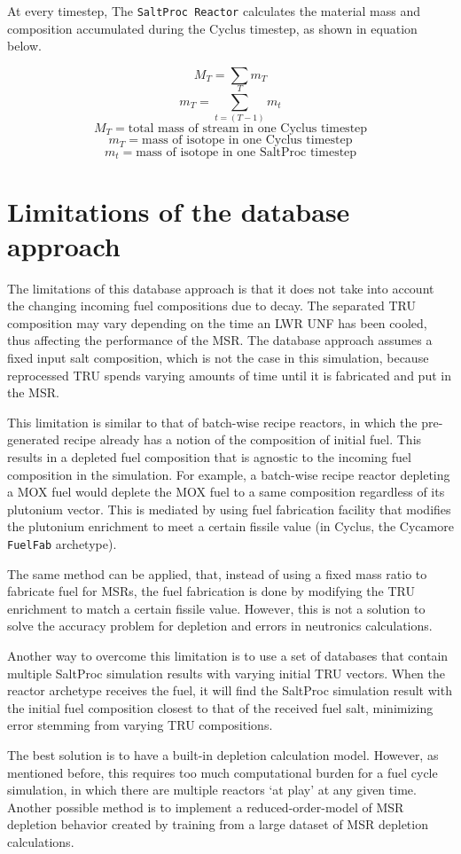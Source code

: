 At every timestep, 
The \texttt{SaltProc Reactor} calculates the material mass
and composition accumulated during the Cyclus timestep,
as shown in equation below.

\[
M_{T} = \sum m_T
\]
\[
m_{T} = \sum_{t=(T-1)}^{T} m_{t}
\]
\[
M_T = \text{total mass of stream in one Cyclus timestep}
\]
\[
m_T = \text{mass of isotope in one Cyclus timestep}
\]
\[
m_t = \text{mass of isotope in one SaltProc timestep}
\]


\section{Limitations of the database approach}
\label{sec:limit}
The limitations of this database approach is that it does not
take into account the changing incoming fuel compositions due to decay.
The separated \gls{TRU} composition may vary depending on the time
an \gls{LWR} \gls{UNF} has been cooled, thus affecting the performance
of the \gls{MSR}. The database approach assumes a fixed input salt
composition, which is not the case in this simulation, because reprocessed
\gls{TRU} spends varying amounts of time until it is fabricated and
put in the \gls{MSR}.

This limitation is similar to that of batch-wise recipe reactors, in which the 
pre-generated recipe already has a notion of the composition of initial fuel.
This results in a depleted fuel composition that is agnostic to the incoming
fuel composition in the simulation. For example, a batch-wise recipe reactor
depleting a \gls{MOX} fuel would deplete the \gls{MOX} fuel to a same
composition regardless of its plutonium vector. This is mediated by using
fuel fabrication facility that modifies the plutonium enrichment to
meet a certain fissile value (in Cyclus, the Cycamore \texttt{FuelFab} archetype).

The same method can be applied, that, instead of using a fixed mass ratio
to fabricate fuel for \glspl{MSR}, the fuel fabrication is done by modifying
the \gls{TRU} enrichment to match a certain fissile value. However, this is
not a solution to solve the accuracy problem for depletion and errors
in neutronics calculations.

Another way to overcome this limitation is to use a set of databases 
that contain multiple SaltProc simulation results with varying initial \gls{TRU}
vectors. When the reactor archetype receives the fuel, it will find the
SaltProc simulation result with the initial fuel composition closest to that
of the received fuel salt, minimizing error stemming from varying
\gls{TRU} compositions.

The best solution is to have a built-in depletion calculation model. However,
as mentioned before, this requires too much computational burden for a fuel cycle simulation,
in which there are multiple reactors `at play' at any given time. Another
possible method is to implement a reduced-order-model of \gls{MSR} depletion
behavior created by training from a large dataset of \gls{MSR} depletion
calculations.